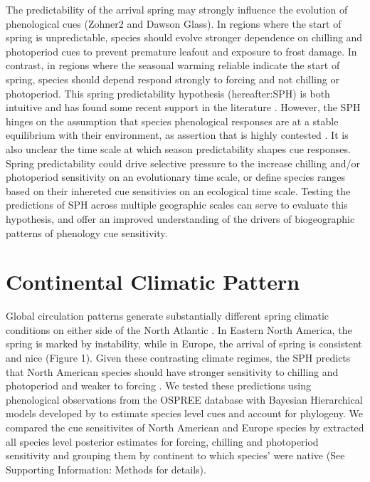 \documentclass[12pt]{article}
\begin{document}
The predictability of the arrival spring may strongly influence the evolution of phenological cues \citep{Zohner:2017aa} (Zohner2 and Dawson Glass). In regions where the start of spring is unpredictable, species should evolve stronger dependence on chilling and photoperiod cues to prevent premature leafout and exposure to frost damage. In contrast, in regions where the seasonal warming reliable indicate the start of spring, species should depend respond strongly to forcing and not chilling or photoperiod. This spring predictability hypothesis (hereafter:SPH) is both intuitive and has found some recent support in the literature \citep{Zohner:2017aa}. However, the SPH hinges on the assumption that species phenological responses are at a stable equilibrium with their environment, as assertion that is highly contested \citep{}. It is also unclear the time scale at which season predictability shapes cue responses. Spring predictability could drive selective pressure to the increase chilling and/or photoperiod sensitivity on an evolutionary time scale, or define species ranges based on their inhereted cue sensitivies on an ecological time scale. Testing the predictions of SPH across multiple geographic scales can serve to evaluate this hypothesis, and offer an improved understanding of the drivers of biogeographic patterns of phenology cue sensitivity.

\section*{Continental Climatic Pattern}

Global circulation patterns generate substantially different spring climatic conditions on either side of the North Atlantic \citep{}. In Eastern North America, the spring is marked by instability, while in Europe, the arrival of spring is consistent and nice (Figure 1). Given these contrasting climate regimes, the SPH predicts that North American species should have stronger sensitivity to chilling and photoperiod and weaker to forcing \citep{Dawson Glass}. We tested these predictions using phenological observations from the OSPREE database  with Bayesian Hierarchical models developed by \citet{Nacho} to estimate species level cues and account for phylogeny. We compared the cue sensitivites of North American and Europe species by extracted all species level posterior estimates for forcing, chilling and photoperiod sensitivity and grouping them  by continent to which species' were native (See Supporting Information: Methods for details).
\end{document}
